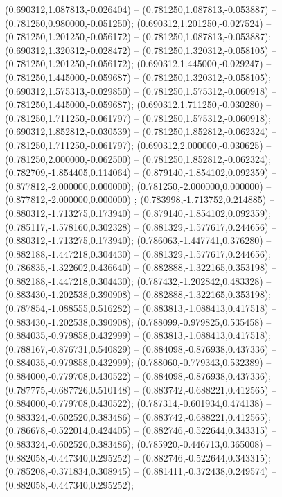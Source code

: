  (0.690312,1.087813,-0.026404) -- (0.781250,1.087813,-0.053887) -- (0.781250,0.980000,-0.051250);
 (0.690312,1.201250,-0.027524) -- (0.781250,1.201250,-0.056172) -- (0.781250,1.087813,-0.053887);
 (0.690312,1.320312,-0.028472) -- (0.781250,1.320312,-0.058105) -- (0.781250,1.201250,-0.056172);
 (0.690312,1.445000,-0.029247) -- (0.781250,1.445000,-0.059687) -- (0.781250,1.320312,-0.058105);
 (0.690312,1.575313,-0.029850) -- (0.781250,1.575312,-0.060918) -- (0.781250,1.445000,-0.059687);
 (0.690312,1.711250,-0.030280) -- (0.781250,1.711250,-0.061797) -- (0.781250,1.575312,-0.060918);
 (0.690312,1.852812,-0.030539) -- (0.781250,1.852812,-0.062324) -- (0.781250,1.711250,-0.061797);
 (0.690312,2.000000,-0.030625) -- (0.781250,2.000000,-0.062500) -- (0.781250,1.852812,-0.062324);
 (0.782709,-1.854405,0.114064) -- (0.879140,-1.854102,0.092359) -- (0.877812,-2.000000,0.000000);
 (0.781250,-2.000000,0.000000) -- (0.877812,-2.000000,0.000000) ;
 (0.783998,-1.713752,0.214885) -- (0.880312,-1.713275,0.173940) -- (0.879140,-1.854102,0.092359);
 (0.785117,-1.578160,0.302328) -- (0.881329,-1.577617,0.244656) -- (0.880312,-1.713275,0.173940);
 (0.786063,-1.447741,0.376280) -- (0.882188,-1.447218,0.304430) -- (0.881329,-1.577617,0.244656);
 (0.786835,-1.322602,0.436640) -- (0.882888,-1.322165,0.353198) -- (0.882188,-1.447218,0.304430);
 (0.787432,-1.202842,0.483328) -- (0.883430,-1.202538,0.390908) -- (0.882888,-1.322165,0.353198);
 (0.787854,-1.088555,0.516282) -- (0.883813,-1.088413,0.417518) -- (0.883430,-1.202538,0.390908);
 (0.788099,-0.979825,0.535458) -- (0.884035,-0.979858,0.432999) -- (0.883813,-1.088413,0.417518);
 (0.788167,-0.876731,0.540829) -- (0.884098,-0.876938,0.437336) -- (0.884035,-0.979858,0.432999);
 (0.788060,-0.779343,0.532389) -- (0.884000,-0.779708,0.430522) -- (0.884098,-0.876938,0.437336);
 (0.787775,-0.687726,0.510148) -- (0.883742,-0.688221,0.412565) -- (0.884000,-0.779708,0.430522);
 (0.787314,-0.601934,0.474138) -- (0.883324,-0.602520,0.383486) -- (0.883742,-0.688221,0.412565);
 (0.786678,-0.522014,0.424405) -- (0.882746,-0.522644,0.343315) -- (0.883324,-0.602520,0.383486);
 (0.785920,-0.446713,0.365008) -- (0.882058,-0.447340,0.295252) -- (0.882746,-0.522644,0.343315);
 (0.785208,-0.371834,0.308945) -- (0.881411,-0.372438,0.249574) -- (0.882058,-0.447340,0.295252);
